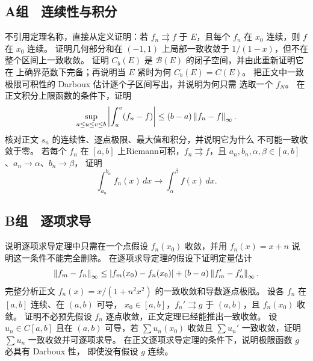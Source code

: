 \subsection*{A组　连续性与积分}
\begin{enumerate}[label=\textbf{\thechapter.\arabic*.}]
 不引用定理名称，直接从定义证明：若 \(f_n\rightrightarrows f\) 于
 \(E\)，且每个 \(f_n\) 在 \(x_0\) 连续，则 \(f\) 在 \(x_0\) 连续。
 证明几何部分和在 \((-1,1)\) 上局部一致收敛于 \(1/(1-x)\)，但不在
 整个区间上一致收敛。
 证明 \(C_b(E)\) 是 \(\mathcal B(E)\) 的闭子空间，并由此重新证明它在
 上确界范数下完备；再说明当 \(E\) 紧时为何 \(C_b(E)=C(E)\)。
 把正文中一致极限可积性的 Darboux 估计逐个子区间写出，并说明为何只需
 选取一个 \(f_N\)。
 在正文积分上限函数的条件下，证明
 \[
  \sup_{a\le u\le v\le b}
  \left|\int_u^v(f_n-f)\right|
  \le(b-a)\left\lVert f_n-f\right\rVert_\infty.
 \]
 核对正文 \(s_n\) 的连续性、逐点极限、最大值和积分，并说明它为什么
 不可能一致收敛于零。
 若每个 \(f_n\) 在 \([a,b]\) 上Riemann可积，\(f_n\rightrightarrows f\)，且
 \(a_n,b_n,\alpha,\beta\in[a,b]\)、\(a_n\to\alpha\)、\(b_n\to\beta\)，
 证明
 \[
  \int_{a_n}^{b_n}f_n(x)\,dx\to\int_\alpha^\beta f(x)\,dx.
 \]
\end{enumerate}

\subsection*{B组　逐项求导}
\begin{enumerate}[label=\textbf{\thechapter.\arabic*.},resume]
 说明逐项求导定理中只需在一个点假设 \(f_n(x_0)\) 收敛，并用
 \(f_n(x)=x+n\) 说明这一条件不能完全删除。
 在逐项求导定理的假设下证明定量估计
 \[
  \left\lVert f_m-f_n\right\rVert_\infty
  \le |f_m(x_0)-f_n(x_0)|
    +(b-a)\left\lVert f_m'-f_n'\right\rVert_\infty.
 \]
 完整分析正文 \(f_n(x)=x/(1+n^2x^2)\) 的一致收敛和导数逐点极限。
 设各 \(f_n\) 在 \([a,b]\) 连续、在 \((a,b)\) 可导，
 \(x_0\in[a,b]\)，\(f_n'\rightrightarrows g\) 于 \((a,b)\)，且 \(f_n(x_0)\) 收敛。
 证明不必预先假设 \(f_n\) 逐点收敛，正文定理已经能推出一致收敛。
 设 \(u_n\in C[a,b]\) 且在 \((a,b)\) 可导，若
 \(\sum u_n(x_0)\) 收敛且 \(\sum u_n'\) 一致收敛，证明
 \(\sum u_n\) 一致收敛并可逐项求导。
 在正文逐项求导定理的条件下，说明极限函数 \(g\) 必具有 Darboux 性，
 即使没有假设 \(g\) 连续。
\end{enumerate}

